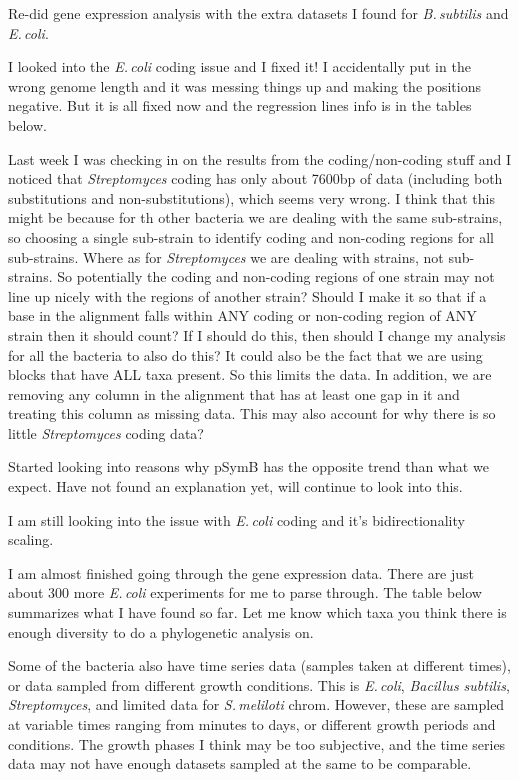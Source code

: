 \documentclass[12pt]{article}
\newcommand{\smel}{\textit{S.\,meliloti}\xspace}
\newcommand{\bas}{\textit{Bacillus subtilis}\xspace}
\newcommand{\strep}{\textit{Streptomyces}\xspace}
\newcommand{\bass}{\textit{B.\,subtilis}\xspace}
\newcommand{\ecol}{\textit{E.\,coli}\xspace}
\newcommand{\pb}{pSymB\xspace}
\begin{document}
Re-did gene expression analysis with the extra datasets I found for \bass and \ecol.

I looked into the \ecol coding issue and I fixed it! I accidentally put in the wrong genome length and it was messing things up and making the positions negative. But it is all fixed now and the regression lines info is in the tables below.


Last week I was checking in on the results from the coding/non-coding stuff and I noticed that \strep coding has only about 7600bp of data (including both substitutions and non-substitutions), which seems very wrong.
I think that this might be because for th other bacteria we are dealing with the same sub-strains, so choosing a single sub-strain to identify coding and non-coding regions for all sub-strains.
Where as for \strep we are dealing with strains, not sub-strains. So potentially the coding and non-coding regions of one strain may not line up nicely with the regions of another strain?
Should I make it so that if a base in the alignment falls within ANY coding or non-coding region of ANY strain then it should count?
If I should do this, then should I change my analysis for all the bacteria to also do this?
It could also be the fact that we are using blocks that have ALL taxa present. So this limits the data. In addition, we are removing any column in the alignment that has at least one gap in it and treating this column as missing data.
This may also account for why there is so little \strep coding data?

Started looking into reasons why \pb has the opposite trend than what we expect.
Have not found an explanation yet, will continue to look into this.

I am still looking into the issue with \ecol coding and it's bidirectionality scaling.

I am almost finished going through the gene expression data. There are just about 300 more \ecol experiments for me to parse through.
The table below summarizes what I have found so far.
Let me know which taxa you think there is enough diversity to do a phylogenetic analysis on.

Some of the bacteria also have time series data (samples taken at different times), or data sampled from different growth conditions. This is \ecol, \bas, \strep, and limited data for \smel chrom.
However, these are sampled at variable times ranging from minutes to days, or different growth periods and conditions.
The growth phases I think may be too subjective, and the time series data may not have enough datasets sampled at the same to be comparable.
\end{document}

